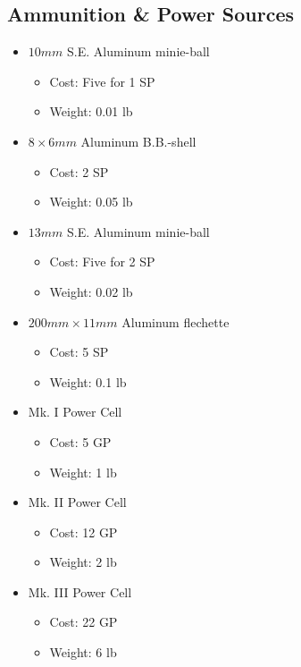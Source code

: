 \documentclass[12pt, landscape]{article}
\begin{document}
\begin{FlushLeft}
\begin{multicols}{2}
			\subsection{Ammunition \& Power Sources}
			\begin{itemize}
				\item $10mm$ S.E. Aluminum minie-ball
				\begin{itemize}
					\item Cost: Five for 1 SP
					\item Weight: 0.01 lb
				\end{itemize}
				\item $8 \times 6mm$ Aluminum B.B.-shell
				\begin{itemize}
					\item Cost: 2 SP
					\item Weight: 0.05 lb
				\end{itemize}
				\item $13mm$ S.E. Aluminum minie-ball
				\begin{itemize}
					\item Cost: Five for 2 SP
					\item Weight: 0.02 lb
				\end{itemize}
				\item $200mm \times 11mm$ Aluminum flechette
				\begin{itemize}
					\item Cost: 5 SP
					\item Weight: 0.1 lb
				\end{itemize}
				\item Mk. I Power Cell
				\begin{itemize}
					\item Cost: 5 GP
					\item Weight: 1 lb
				\end{itemize}
				\item Mk. II Power Cell
				\begin{itemize}
					\item Cost: 12 GP
					\item Weight: 2 lb
				\end{itemize}
				\item Mk. III Power Cell
				\begin{itemize}
					\item Cost: 22 GP
					\item Weight: 6 lb
				\end{itemize}
			\end{itemize}
			\vfill \pagebreak


\end{multicols}
\end{FlushLeft}
\end{document}
